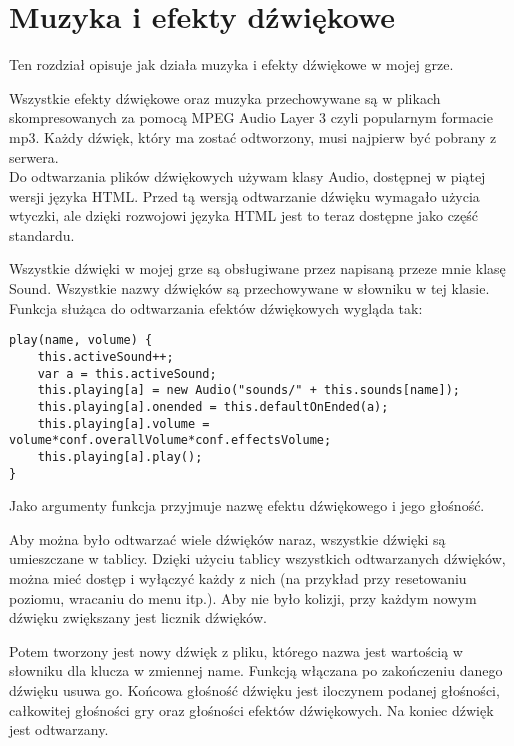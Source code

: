 \chapter{Muzyka i efekty dźwiękowe}
\thispagestyle{chapterBeginStyle}
\label{chapter_music}

Ten rozdział opisuje jak działa muzyka i efekty dźwiękowe w mojej grze.\vspace{10pt}\\
\smallskip

Wszystkie efekty dźwiękowe oraz muzyka przechowywane są w plikach skompresowanych za pomocą MPEG Audio Layer 3 czyli popularnym formacie mp3. Każdy dźwięk, który ma zostać odtworzony, musi najpierw być pobrany z serwera.\\

Do odtwarzania plików dźwiękowych używam klasy Audio, dostępnej w piątej wersji języka HTML. Przed tą wersją odtwarzanie dźwięku wymagało użycia wtyczki, ale dzięki rozwojowi języka HTML jest to teraz dostępne jako czę\'sć standardu.\\

\smallskip

Wszystkie dźwięki w mojej grze są obsługiwane przez napisaną przeze mnie klasę Sound. Wszystkie nazwy dźwięków są przechowywane w słowniku w tej klasie. Funkcja służąca do odtwarzania efektów dźwiękowych wygląda tak:
\begin{lstlisting}
play(name, volume) {
	this.activeSound++;
	var a = this.activeSound;
	this.playing[a] = new Audio("sounds/" + this.sounds[name]);
	this.playing[a].onended = this.defaultOnEnded(a);
	this.playing[a].volume = volume*conf.overallVolume*conf.effectsVolume;
	this.playing[a].play();
}
\end{lstlisting}
Jako argumenty funkcja przyjmuje nazwę efektu dźwiękowego i jego gło\'sno\'sć.

Aby można było odtwarzać wiele dźwięków naraz, wszystkie dźwięki są umieszczane w tablicy. Dzięki użyciu tablicy wszystkich odtwarzanych dźwięków, można mieć dostęp i wyłączyć każdy z nich (na przykład przy resetowaniu poziomu, wracaniu do menu itp.). Aby nie było kolizji, przy każdym nowym dźwięku zwiększany jest licznik dźwięków.

Potem tworzony jest nowy dźwięk z pliku, którego nazwa jest warto\'scią w słowniku dla klucza w zmiennej name. Funkcją włączana po zakończeniu danego dźwięku usuwa go. Końcowa gło\'sno\'sć dźwięku jest iloczynem podanej gło\'sno\'sci, całkowitej gło\'sno\'sci gry oraz gło\'sno\'sci efektów dźwiękowych. Na koniec dźwięk jest odtwarzany.

